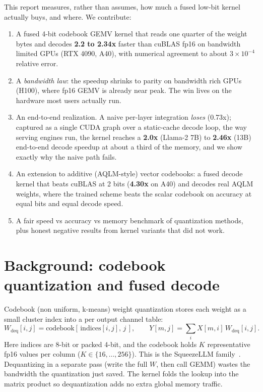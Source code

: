 \documentclass[11pt]{article}
\begin{document}
This report measures, rather than assumes, how much a fused low-bit kernel
actually buys, and where. We contribute:
\begin{enumerate}
  \item A fused 4-bit codebook GEMV kernel that reads one quarter of the weight
        bytes and decodes \textbf{2.2 to 2.34x} faster than cuBLAS fp16 on
        bandwidth limited GPUs (RTX 4090, A40), with numerical agreement to about
        $3{\times}10^{-4}$ relative error.
  \item A \emph{bandwidth law}: the speedup shrinks to parity on bandwidth rich
        GPUs (H100), where fp16 GEMV is already near peak. The win lives on the
        hardware most users actually run.
  \item An end-to-end realization. A naive per-layer integration \emph{loses}
        (0.73x); captured as a single CUDA graph over a static-cache decode loop,
        the way serving engines run, the kernel reaches a \textbf{2.0x} (Llama-2 7B)
        to \textbf{2.46x} (13B) end-to-end decode speedup at about a third of the
        memory, and we show exactly why the naive path fails.
  \item An extension to additive (AQLM-style) vector codebooks: a fused decode
        kernel that beats cuBLAS at 2 bits (\textbf{4.30x} on A40) and decodes real
        AQLM weights, where the trained scheme beats the scalar codebook on accuracy
        at equal bits and equal decode speed.
  \item A fair speed vs accuracy vs memory benchmark of quantization methods,
        plus honest negative results from kernel variants that did not work.
\end{enumerate}

\section{Background: codebook quantization and fused decode}
Codebook (non uniform, k-means) weight quantization stores each weight as a small
cluster index into a per output channel table:
\begin{equation}
W_{\text{deq}}[i,j] = \text{codebook}[\,\text{indices}[i,j],\, j\,], \qquad
Y[m,j] = \sum_i X[m,i]\, W_{\text{deq}}[i,j].
\end{equation}
Here indices are 8-bit or packed 4-bit, and the codebook holds $K$ representative
fp16 values per column ($K \in \{16,\dots,256\}$). This is the SqueezeLLM
family~\cite{squeezellm}.
Dequantizing in a separate pass (write the full $W$, then call GEMM) wastes the
bandwidth the quantization just saved. The kernel folds the lookup into the matrix
product so dequantization adds no extra global memory traffic.
\end{document}
